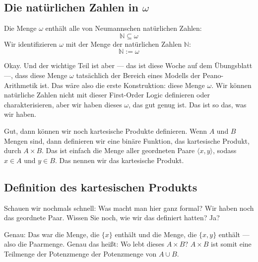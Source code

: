 \subsection{Die natürlichen Zahlen in \texorpdfstring{$\omega$}{omega}}
\begin{math-stroke}
\begin{remark}
Die Menge $\omega$ enthält alle von Neumannschen natürlichen Zahlen:
\[
\mathbb{N} \subseteq \omega
\]
Wir identifizieren $\omega$ mit der Menge der natürlichen Zahlen $\mathbb{N}$:
\[
\mathbb{N} := \omega
\]
\end{remark}
\end{math-stroke}

\begin{spoken-clean}[00:51:19 - 00:53:29]
Okay. Und der wichtige Teil ist aber --- das ist diese Woche auf dem Übungsblatt ---, dass diese Menge $\omega$ tatsächlich der Bereich eines Modells der Peano-Arithmetik ist. Das wäre also die erste Konstruktion: diese Menge $\omega$. Wir können natürliche Zahlen nicht mit dieser First-Order Logic definieren oder charakterisieren, aber wir haben dieses $\omega$, das gut genug ist. Das ist so das, was wir haben.

Gut, dann können wir noch kartesische Produkte definieren. Wenn $A$ und $B$ Mengen sind, dann definieren wir eine binäre Funktion, das kartesische Produkt, durch $A \times B$. Das ist einfach die Menge aller geordneten Paare $\langle x, y \rangle$, sodass $x \in A$ und $y \in B$. Das nennen wir das kartesische Produkt.
\end{spoken-clean}

\subsection{Definition des kartesischen Produkts}
\begin{math-stroke}
\end{math-stroke}

\begin{spoken-clean}[continued]
Schauen wir nochmals schnell: Was macht man hier ganz formal? Wir haben noch das geordnete Paar. Wissen Sie noch, wie wir das definiert hatten? Ja?

Genau: Das war die Menge, die $\{x\}$ enthält und die Menge, die $\{x, y\}$ enthält --- also die Paarmenge. Genau das heißt: Wo lebt dieses $A \times B$? $A \times B$ ist somit eine Teilmenge der Potenzmenge der Potenzmenge von $A \cup B$.
\end{spoken-clean}

